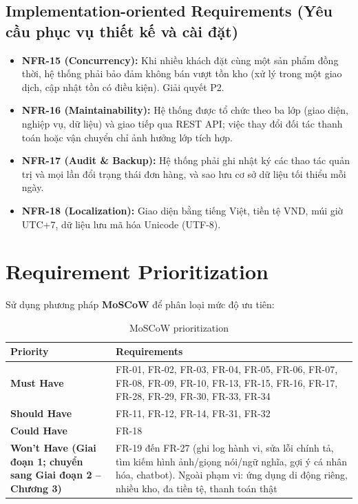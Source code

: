 \documentclass[12pt,a4paper,oneside]{report}
\begin{document}
\subsection{Implementation-oriented Requirements (Yêu cầu phục vụ thiết kế và cài đặt)}

\begin{itemize}
  \item \textbf{NFR-15 (Concurrency):} Khi nhiều khách đặt cùng một sản phẩm đồng thời, hệ thống phải bảo đảm không bán vượt tồn kho (xử lý trong một giao dịch, cập nhật tồn có điều kiện). Giải quyết P2.
  \item \textbf{NFR-16 (Maintainability):} Hệ thống được tổ chức theo ba lớp (giao diện, nghiệp vụ, dữ liệu) và giao tiếp qua REST API; việc thay đổi đối tác thanh toán hoặc vận chuyển chỉ ảnh hưởng lớp tích hợp.
  \item \textbf{NFR-17 (Audit \& Backup):} Hệ thống phải ghi nhật ký các thao tác quản trị và mọi lần đổi trạng thái đơn hàng, và sao lưu cơ sở dữ liệu tối thiểu mỗi ngày.
  \item \textbf{NFR-18 (Localization):} Giao diện bằng tiếng Việt, tiền tệ VND, múi giờ UTC+7, dữ liệu lưu mã hóa Unicode (UTF-8).
\end{itemize}

\section{Requirement Prioritization}

Sử dụng phương pháp \textbf{MoSCoW} để phân loại mức độ ưu tiên:

\begin{longtable}{p{4.2cm}p{11.8cm}}
\caption{MoSCoW prioritization}\\
\toprule
\textbf{Priority} & \textbf{Requirements} \\
\midrule
\endhead
\bottomrule
\endlastfoot
\textbf{Must Have} & FR-01, FR-02, FR-03, FR-04, FR-05, FR-06, FR-07, FR-08, FR-09, FR-10, FR-13, FR-15, FR-16, FR-17, FR-28, FR-29, FR-30, FR-33, FR-34 \\
\textbf{Should Have} & FR-11, FR-12, FR-14, FR-31, FR-32 \\
\textbf{Could Have} & FR-18 \\
\textbf{Won't Have (Giai đoạn 1; chuyển sang Giai đoạn 2 -- Chương 3)} & FR-19 đến FR-27 (ghi log hành vi, sửa lỗi chính tả, tìm kiếm hình ảnh/giọng nói/ngữ nghĩa, gợi ý cá nhân hóa, chatbot). Ngoài phạm vi: ứng dụng di động riêng, nhiều kho, đa tiền tệ, thanh toán thật \\
\end{longtable}
\end{document}

